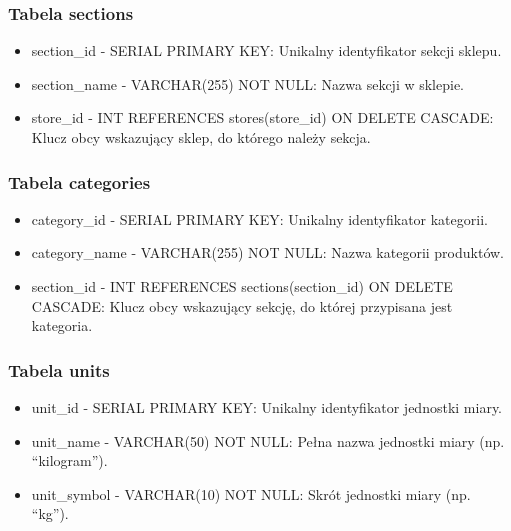 \subsubsection{Tabela sections}
\begin{itemize}
\item section\_id - SERIAL PRIMARY KEY: Unikalny identyfikator sekcji sklepu.
\item section\_name - VARCHAR(255) NOT NULL: Nazwa sekcji w sklepie.
\item store\_id - INT REFERENCES stores(store\_id) ON DELETE CASCADE: Klucz obcy wskazujący sklep, do którego należy sekcja.
\end{itemize}

\subsubsection{Tabela categories}
\begin{itemize}
\item category\_id - SERIAL PRIMARY KEY: Unikalny identyfikator kategorii.
\item category\_name - VARCHAR(255) NOT NULL: Nazwa kategorii produktów.
\item section\_id - INT REFERENCES sections(section\_id) ON DELETE CASCADE: Klucz obcy wskazujący sekcję, do której przypisana jest kategoria.
\end{itemize}

\subsubsection{Tabela units}
\begin{itemize}
\item unit\_id - SERIAL PRIMARY KEY: Unikalny identyfikator jednostki miary.
\item unit\_name - VARCHAR(50) NOT NULL: Pełna nazwa jednostki miary (np. “kilogram”).
\item unit\_symbol - VARCHAR(10) NOT NULL: Skrót jednostki miary (np. “kg”).
\end{itemize}

